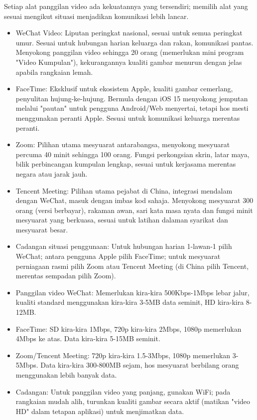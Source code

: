 
Setiap alat panggilan video ada kekuatannya yang tersendiri; memilih alat yang sesuai mengikut situasi menjadikan komunikasi lebih lancar.

\begin{itemize}
  \item WeChat Video: Liputan peringkat nasional, sesuai untuk semua peringkat umur. Sesuai untuk hubungan harian keluarga dan rakan, komunikasi pantas. Menyokong panggilan video sehingga 20 orang (memerlukan mini program "Video Kumpulan"), kekurangannya kualiti gambar menurun dengan jelas apabila rangkaian lemah.
  \item FaceTime: Eksklusif untuk ekosistem Apple, kualiti gambar cemerlang, penyulitan hujung-ke-hujung. Bermula dengan iOS 15 menyokong jemputan melalui "pautan" untuk pengguna Android/Web menyertai, tetapi hos mesti menggunakan peranti Apple. Sesuai untuk komunikasi keluarga merentas peranti.
  \item Zoom: Pilihan utama mesyuarat antarabangsa, menyokong mesyuarat percuma 40 minit sehingga 100 orang. Fungsi perkongsian skrin, latar maya, bilik perbincangan kumpulan lengkap, sesuai untuk kerjasama merentas negara atau jarak jauh.
  \item Tencent Meeting: Pilihan utama pejabat di China, integrasi mendalam dengan WeChat, masuk dengan imbas kod sahaja. Menyokong mesyuarat 300 orang (versi berbayar), rakaman awan, sari kata masa nyata dan fungsi minit mesyuarat yang berkuasa, sesuai untuk latihan dalaman syarikat dan mesyuarat besar.
  \item Cadangan situasi penggunaan: Untuk hubungan harian 1-lawan-1 pilih WeChat; antara pengguna Apple pilih FaceTime; untuk mesyuarat perniagaan rasmi pilih Zoom atau Tencent Meeting (di China pilih Tencent, merentas sempadan pilih Zoom).
\end{itemize}


\begin{itemize}
  \item Panggilan video WeChat: Memerlukan kira-kira 500Kbps-1Mbps lebar jalur, kualiti standard menggunakan kira-kira 3-5MB data seminit, HD kira-kira 8-12MB.
  \item FaceTime: SD kira-kira 1Mbps, 720p kira-kira 2Mbps, 1080p memerlukan 4Mbps ke atas. Data kira-kira 5-15MB seminit.
  \item Zoom/Tencent Meeting: 720p kira-kira 1.5-3Mbps, 1080p memerlukan 3-5Mbps. Data kira-kira 300-800MB sejam, hos mesyuarat berbilang orang menggunakan lebih banyak data.
  \item Cadangan: Untuk panggilan video yang panjang, gunakan WiFi; pada rangkaian mudah alih, turunkan kualiti gambar secara aktif (matikan "video HD" dalam tetapan aplikasi) untuk menjimatkan data.
\end{itemize}

